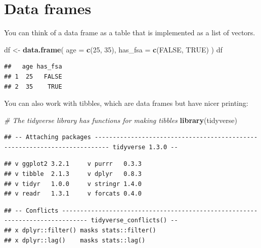 \documentclass[
  openany]{book}
\newenvironment{Shaded}{\begin{snugshade}}{\end{snugshade}}
\newcommand{\CommentTok}[1]{\textcolor[rgb]{0.56,0.35,0.01}{\textit{#1}}}
\newcommand{\DataTypeTok}[1]{\textcolor[rgb]{0.13,0.29,0.53}{#1}}
\newcommand{\DecValTok}[1]{\textcolor[rgb]{0.00,0.00,0.81}{#1}}
\newcommand{\KeywordTok}[1]{\textcolor[rgb]{0.13,0.29,0.53}{\textbf{#1}}}
\newcommand{\NormalTok}[1]{#1}
\newcommand{\OtherTok}[1]{\textcolor[rgb]{0.56,0.35,0.01}{#1}}
\newcommand{\StringTok}[1]{\textcolor[rgb]{0.31,0.60,0.02}{#1}}
\begin{document}
\hypertarget{data-frames}{%
\section{Data frames}\label{data-frames}}

You can think of a data frame as a table that is implemented as a list of vectors.

\begin{Shaded}
\begin{Highlighting}[]
\NormalTok{df <-}\StringTok{ }\KeywordTok{data.frame}\NormalTok{(}
  \DataTypeTok{age =} \KeywordTok{c}\NormalTok{(}\DecValTok{25}\NormalTok{, }\DecValTok{35}\NormalTok{),}
  \DataTypeTok{has_fsa =} \KeywordTok{c}\NormalTok{(}\OtherTok{FALSE}\NormalTok{, }\OtherTok{TRUE}\NormalTok{)}
\NormalTok{)}
\NormalTok{df}
\end{Highlighting}
\end{Shaded}

\begin{verbatim}
##   age has_fsa
## 1  25   FALSE
## 2  35    TRUE
\end{verbatim}

You can also work with tibbles, which are data frames but have nicer printing:

\begin{Shaded}
\begin{Highlighting}[]
\CommentTok{# The tidyverse library has functions for making tibbles}
\KeywordTok{library}\NormalTok{(tidyverse) }
\end{Highlighting}
\end{Shaded}

\begin{verbatim}
## -- Attaching packages -------------------------------------------------------------------------- tidyverse 1.3.0 --
\end{verbatim}

\begin{verbatim}
## v ggplot2 3.2.1     v purrr   0.3.3
## v tibble  2.1.3     v dplyr   0.8.3
## v tidyr   1.0.0     v stringr 1.4.0
## v readr   1.3.1     v forcats 0.4.0
\end{verbatim}

\begin{verbatim}
## -- Conflicts ----------------------------------------------------------------------------- tidyverse_conflicts() --
## x dplyr::filter() masks stats::filter()
## x dplyr::lag()    masks stats::lag()
\end{verbatim}
\end{document}
